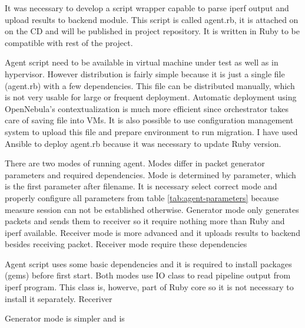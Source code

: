 
It was necessary to develop a script wrapper capable to parse iperf output and upload results to backend module. This script is called agent.rb, it is attached on on the CD and will be published in project repository. It is written in Ruby to be compatible with rest of the project.

Agent script need to be available in virtual machine under test as well as in hypervisor. However distribution is fairly simple because it is just a single file (agent.rb) with a few dependencies. This file can be distributed manually, which is not very usable for large or frequent deployment. Automatic deployment using OpenNebula's contextualization is much more efficient since orchestrator takes care of saving file into \Ac{VM}s. 
It is also possible to use configuration management system to upload this file and prepare environment to run migration. I have used Ansible to deploy agent.rb because it was necessary to update Ruby version. 

There are two modes of running agent. Modes differ in packet generator parameters and required dependencies. Mode is determined by  parameter, which is the first parameter after filename. It is necessary select correct mode and properly configure all parameters from table \ref{tab:agent-parameters} because measure session can not be established otherwise. Generator mode only generates packets and sends them to receiver so it require nothing more than Ruby and iperf available. Receiver mode is more advanced and it uploads results to backend besides receiving packet. Receiver mode require these dependencies
\begin{itemize}
	
\end{itemize}

Agent script uses some basic dependencies and it is required to install packages (gems) before first start. Both modes use IO class to read pipeline output from iperf program. This class is, howerve, part of Ruby core so it is not necessary to install it separately. Receriver 


Generator mode is simpler and is 

